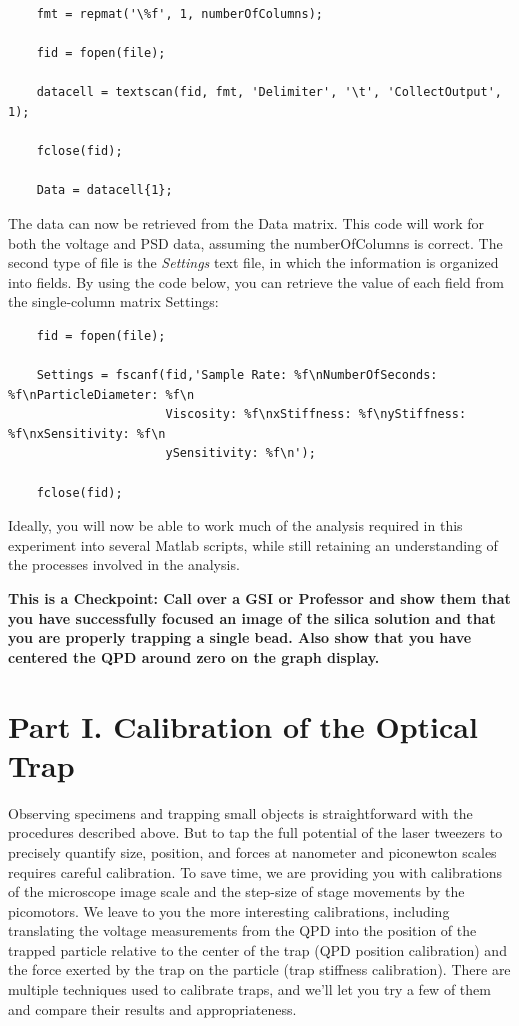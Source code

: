 \documentclass{../lab}
\begin{document}
\begin{verbatim}
    fmt = repmat('\%f', 1, numberOfColumns);

    fid = fopen(file);

    datacell = textscan(fid, fmt, 'Delimiter', '\t', 'CollectOutput', 1);

    fclose(fid);

    Data = datacell{1};
\end{verbatim}

The data can now be retrieved from the Data matrix. This code will work for both the voltage and PSD data, assuming the numberOfColumns is correct. The second type of file is the \emph{Settings} text file, in which the information is organized into fields. By using the code below, you can retrieve the value of each field from the single-column matrix Settings:

\begin{verbatim}
    fid = fopen(file);

    Settings = fscanf(fid,'Sample Rate: %f\nNumberOfSeconds: %f\nParticleDiameter: %f\n
                      Viscosity: %f\nxStiffness: %f\nyStiffness: %f\nxSensitivity: %f\n
                      ySensitivity: %f\n');
    
    fclose(fid);
\end{verbatim}

Ideally, you will now be able to work much of the analysis required in this experiment into several Matlab scripts, while still retaining an understanding of the processes involved in the analysis.

\textbf{This is a Checkpoint: Call over a GSI or Professor and show them that you have successfully focused an image of the silica solution and that you are properly trapping a single bead. Also show that you have centered the QPD around zero on the graph display.}

\section{Part I. Calibration of the Optical Trap}

Observing specimens and trapping small objects is straightforward with the procedures described above. But to tap the full potential of the laser tweezers to precisely quantify size, position, and forces at nanometer and piconewton scales requires careful calibration. To save time, we are providing you with calibrations of the microscope image scale and the step-size of stage movements by the picomotors. We leave to you the more interesting calibrations, including translating the voltage measurements from the QPD into the position of the trapped particle relative to the center of the trap (QPD position calibration) and the force exerted by the trap on the particle (trap stiffness calibration). There are multiple techniques used to calibrate traps, and we'll let you try a few of them and compare their results and appropriateness.
\end{document}
